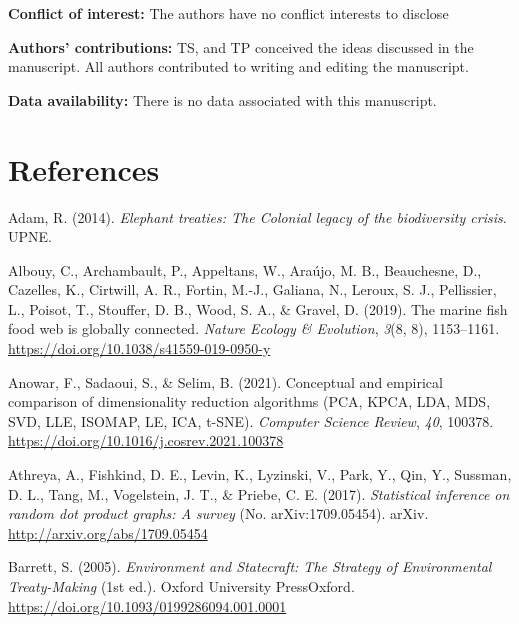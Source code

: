 \documentclass[10pt,oneside]{article}
\newlength{\cslhangindent}
\newenvironment{CSLReferences}[2] %
 {%
  \setlength{\parindent}{0pt}
  \ifodd #1 \everypar{\setlength{\hangindent}{\cslhangindent}}\ignorespaces\fi
  \ifnum #2 > 0
  \setlength{\parskip}{#2\baselineskip}
  \fi
 }%
 {}
\begin{document}
\textbf{Conflict of interest:} The authors have no conflict interests to
disclose

\textbf{Authors' contributions:} TS, and TP conceived the ideas
discussed in the manuscript. All authors contributed to writing and
editing the manuscript.

\textbf{Data availability:} There is no data associated with this
manuscript.

\hypertarget{references}{%
\section*{References}\label{references}}

\hypertarget{refs}{}
\begin{CSLReferences}{1}{0}
\leavevmode{}%
Adam, R. (2014). \emph{Elephant treaties: The Colonial legacy of the
biodiversity crisis}. UPNE.

\leavevmode{}%
Albouy, C., Archambault, P., Appeltans, W., Araújo, M. B., Beauchesne,
D., Cazelles, K., Cirtwill, A. R., Fortin, M.-J., Galiana, N., Leroux,
S. J., Pellissier, L., Poisot, T., Stouffer, D. B., Wood, S. A., \&
Gravel, D. (2019). The marine fish food web is globally connected.
\emph{Nature Ecology \& Evolution}, \emph{3}(8, 8), 1153--1161.
\url{https://doi.org/10.1038/s41559-019-0950-y}

\leavevmode{}%
Anowar, F., Sadaoui, S., \& Selim, B. (2021). Conceptual and empirical
comparison of dimensionality reduction algorithms (PCA, KPCA, LDA, MDS,
SVD, LLE, ISOMAP, LE, ICA, t-SNE). \emph{Computer Science Review},
\emph{40}, 100378. \url{https://doi.org/10.1016/j.cosrev.2021.100378}

\leavevmode{}%
Athreya, A., Fishkind, D. E., Levin, K., Lyzinski, V., Park, Y., Qin,
Y., Sussman, D. L., Tang, M., Vogelstein, J. T., \& Priebe, C. E.
(2017). \emph{Statistical inference on random dot product graphs: A
survey} (No. arXiv:1709.05454). arXiv.
\url{http://arxiv.org/abs/1709.05454}

\leavevmode{}%
Barrett, S. (2005). \emph{Environment and Statecraft: The Strategy of
Environmental Treaty-Making} (1st ed.). Oxford University PressOxford.
\url{https://doi.org/10.1093/0199286094.001.0001}


\end{CSLReferences}
\end{document}
